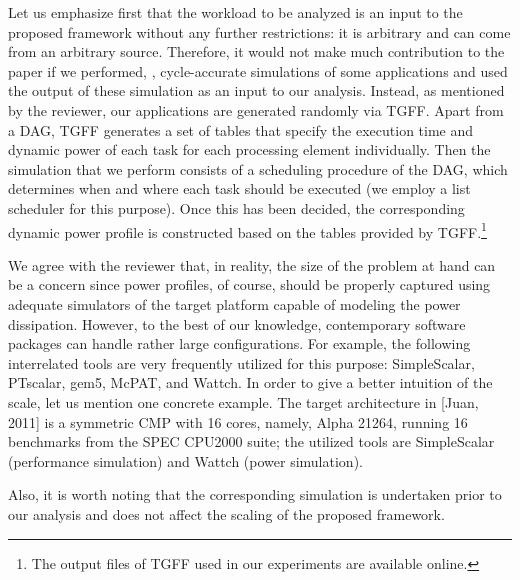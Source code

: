 \begin{authors}
Let us emphasize first that the workload to be analyzed is an input to the proposed framework without any further restrictions: it is arbitrary and can come from an arbitrary source.
Therefore, it would not make much contribution to the paper if we performed, \eg, cycle-accurate simulations of some applications and used the output of these simulation as an input to our analysis.
Instead, as mentioned by the reviewer, our applications are generated randomly via TGFF.
Apart from a DAG, TGFF generates a set of tables that specify the execution time and dynamic power of each task for each processing element individually.
Then the simulation that we perform consists of a scheduling procedure of the DAG, which determines when and where each task should be executed (we employ a list scheduler for this purpose).
Once this has been decided, the corresponding dynamic power profile is constructed based on the tables provided by TGFF.\footnote{The output files of TGFF used in our experiments are available online.}

We agree with the reviewer that, in reality, the size of the problem at hand can be a concern since power profiles, of course, should be properly captured using adequate simulators of the target platform capable of modeling the power dissipation.
However, to the best of our knowledge, contemporary software packages can handle rather large configurations.
For example, the following interrelated tools are very frequently utilized for this purpose: SimpleScalar, PTscalar, gem5, McPAT, and Wattch.
In order to give a better intuition of the scale, let us mention one concrete example.
The target architecture in [Juan, 2011] is a symmetric CMP with 16 cores, namely, Alpha 21264, running 16 benchmarks from the SPEC CPU2000 suite; the utilized tools are SimpleScalar (performance simulation) and Wattch (power simulation).

Also, it is worth noting that the corresponding simulation is undertaken prior to our analysis and does not affect the scaling of the proposed framework.

\begin{actions}
\end{actions}
\end{authors}

